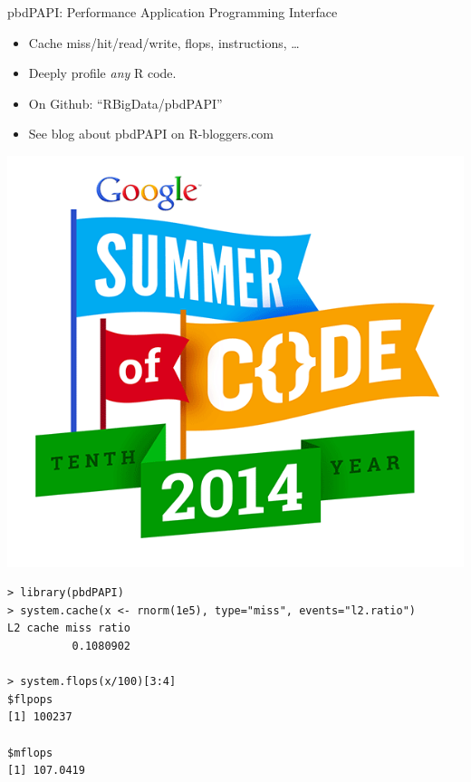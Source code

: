 \begin{frame}[fragile]
  \small
  \begin{block}{pbdPAPI: Performance Application Programming Interface}
    \begin{minipage}[t]{.75\textwidth}
      \vspace{0pt}
      \begin{itemize}
      \item Cache miss/hit/read/write, flops, instructions, \dots
      \item Deeply profile \emph{any} R code.
      \item On Github: ``RBigData/pbdPAPI''
      \item See blog about pbdPAPI on R-bloggers.com
      \end{itemize}
    \end{minipage}
    \hfill
    \begin{minipage}[t]{.2\textwidth}
      \vspace{0pt}
      \hspace*{-.7cm}
      \includegraphics[width=1.2\textwidth]{../common/pics/gsoc_2014}
    \end{minipage}
    \begin{lstlisting}
> library(pbdPAPI)
> system.cache(x <- rnorm(1e5), type="miss", events="l2.ratio")
L2 cache miss ratio 
          0.1080902 

> system.flops(x/100)[3:4]
$flpops
[1] 100237

$mflops
[1] 107.0419
    \end{lstlisting}
  \end{block}
\end{frame}

